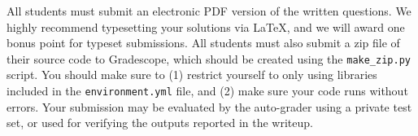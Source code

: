 All students must submit an electronic PDF version of the written questions. We
highly recommend typesetting your solutions via \LaTeX, and we will award one bonus point for typeset submissions. 
All students must also submit a zip file of
their source code to Gradescope, which should be created using the
\texttt{make\_zip.py} script. You
should make sure to (1) restrict yourself to only using libraries included in
the
\texttt{environment.yml} file, and (2) make sure your code runs without errors.
Your submission may be evaluated by the
auto-grader using a private test set, or used for verifying the outputs reported in the writeup. 


